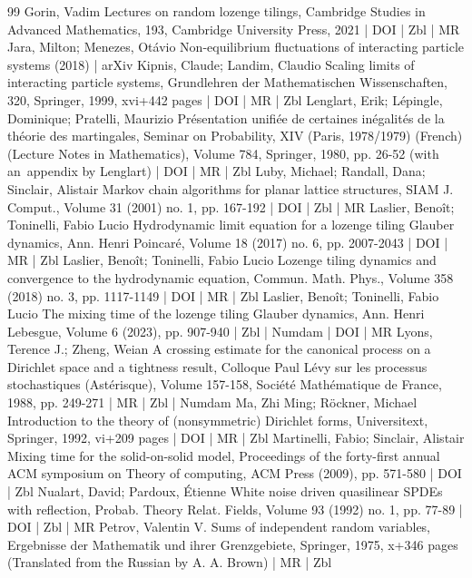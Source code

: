 \documentclass[10pt]{amsart}
\theoremstyle{definition}\newtheorem{defi}[theo]{Definition}\newtheorem{rema}[theo]{Remark}\newtheorem{exam}[theo]{Example}\newtheorem{exem}[theo]{Example}\newtheorem{nota}[theo]{Notation}
\theoremstyle{plain}
\begin{document}
\begin{thebibliography}{99}
 Gorin, Vadim Lectures on random lozenge tilings, Cambridge Studies in Advanced Mathematics, 193, Cambridge University Press, 2021 | DOI | Zbl | MR
 Jara, Milton; Menezes, Otávio Non-equilibrium fluctuations of interacting particle systems (2018) | arXiv
 Kipnis, Claude; Landim, Claudio Scaling limits of interacting particle systems, Grundlehren der Mathematischen Wissenschaften, 320, Springer, 1999, xvi+442 pages | DOI | MR | Zbl
 Lenglart, Erik; Lépingle, Dominique; Pratelli, Maurizio Présentation unifiée de certaines inégalités de la théorie des martingales, Seminar on Probability, XIV (Paris, 1978/1979) (French) (Lecture Notes in Mathematics), Volume 784, Springer, 1980, pp. 26-52 (with an appendix by Lenglart) | DOI | MR | Zbl
 Luby, Michael; Randall, Dana; Sinclair, Alistair Markov chain algorithms for planar lattice structures, SIAM J. Comput., Volume 31 (2001) no. 1, pp. 167-192 | DOI | Zbl | MR
 Laslier, Benoît; Toninelli, Fabio Lucio Hydrodynamic limit equation for a lozenge tiling Glauber dynamics, Ann. Henri Poincaré, Volume 18 (2017) no. 6, pp. 2007-2043 | DOI | MR | Zbl
 Laslier, Benoît; Toninelli, Fabio Lucio Lozenge tiling dynamics and convergence to the hydrodynamic equation, Commun. Math. Phys., Volume 358 (2018) no. 3, pp. 1117-1149 | DOI | MR | Zbl
 Laslier, Benoît; Toninelli, Fabio Lucio The mixing time of the lozenge tiling Glauber dynamics, Ann. Henri Lebesgue, Volume 6 (2023), pp. 907-940 | Zbl | Numdam | DOI | MR
 Lyons, Terence J.; Zheng, Weian A crossing estimate for the canonical process on a Dirichlet space and a tightness result, Colloque Paul Lévy sur les processus stochastiques (Astérisque), Volume 157-158, Société Mathématique de France, 1988, pp. 249-271 | MR | Zbl | Numdam
 Ma, Zhi Ming; Röckner, Michael Introduction to the theory of (nonsymmetric) Dirichlet forms, Universitext, Springer, 1992, vi+209 pages | DOI | MR | Zbl
 Martinelli, Fabio; Sinclair, Alistair Mixing time for the solid-on-solid model, Proceedings of the forty-first annual ACM symposium on Theory of computing, ACM Press (2009), pp. 571-580 | DOI | Zbl
 Nualart, David; Pardoux, Étienne White noise driven quasilinear SPDEs with reflection, Probab. Theory Relat. Fields, Volume 93 (1992) no. 1, pp. 77-89 | DOI | Zbl | MR
 Petrov, Valentin V. Sums of independent random variables, Ergebnisse der Mathematik und ihrer Grenzgebiete, Springer, 1975, x+346 pages (Translated from the Russian by A. A. Brown) | MR | Zbl

\end{thebibliography}
\end{document}
